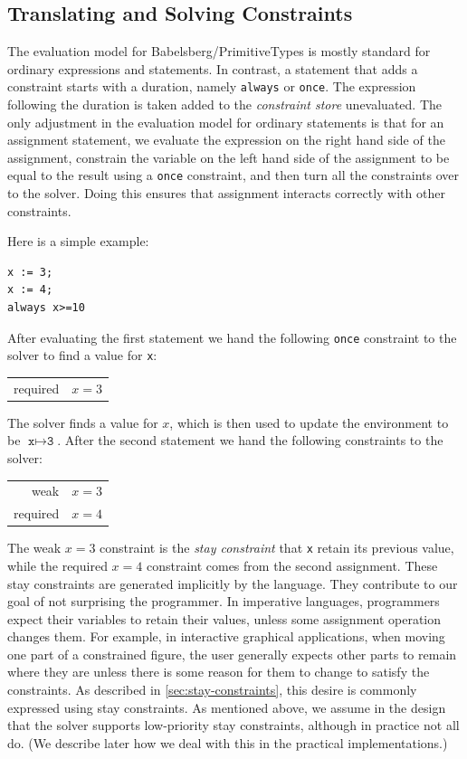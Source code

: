 \subsection{Translating and Solving Constraints}
\label{sec:transl-solv-constr}

The evaluation model for Babelsberg/PrimitiveTypes is mostly standard for
ordinary expressions and statements. In contrast, a statement that adds a
constraint starts with a duration, namely \verb|always| or \verb|once|.  The
expression following the duration is taken added to the \emph{constraint store}
unevaluated. The only adjustment in the evaluation model for ordinary statements
is that for an assignment statement, we evaluate the expression on the right
hand side of the assignment, constrain the variable on the left hand side of the
assignment to be equal to the result using a \verb|once| constraint, and then
turn all the constraints over to the solver.  Doing this ensures that assignment
interacts correctly with other constraints.

Here is a simple example:
\begin{lstlisting}
x := 3;
x := 4;
always x>=10
\end{lstlisting}
After evaluating the first statement we hand the following \verb|once|
constraint to the solver to find a value for \texttt{x}:
\begin{center}
\begin{tabular}{rl}
required & $x=3$
\end{tabular}
\end{center}
The solver finds a value for $x$, which is then used to update the
environment to be $\texttt{x} \mapsto \texttt{3}$. After the second
statement we hand the following constraints to the solver:
\begin{center}
\begin{tabular}{rl}
weak     & $x=3$ \\
required & $x=4$
\end{tabular}
\end{center}
The weak $x=3$ constraint is the \emph{stay constraint} that
\texttt{x} retain its previous value, while the required $x=4$
constraint comes from the second assignment. These stay constraints
are generated implicitly by the language. They contribute to our goal
of not surprising the programmer. In imperative languages, programmers
expect their variables to retain their values, unless some assignment
operation changes them. For example, in interactive graphical
applications, when moving one part of a constrained figure, the user
generally expects other parts to remain where they are unless there is
some reason for them to change to satisfy the constraints. As
described in \autoref{sec:stay-constraints}, this desire is commonly
expressed using stay constraints. As mentioned above, we assume in the
design that the solver supports low-priority stay constraints,
although in practice not all do. (We describe later how we deal with
this in the practical implementations.)


